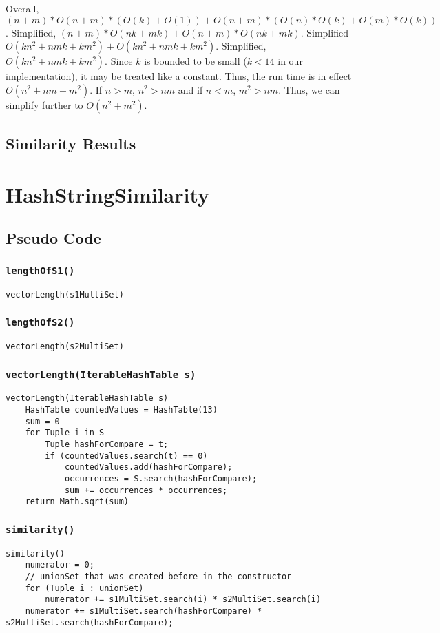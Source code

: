 \documentclass[10pt,letterpaper]{article}
\begin{document}
Overall, $(n+m)*O(n+m)*(O(k)+O(1))+O(n+m)*(O(n)*O(k)+O(m)*O(k))$. Simplified,
$(n+m)*O(nk+mk)+O(n+m)*O(nk+mk)$. Simplified $O(kn^2+nmk+km^2)+O(kn^2+nmk+km^2)$.
Simplified, $O(kn^2+nmk+km^2)$. Since $k$ is bounded to be small ($k<14$ in
our implementation), it may be treated like a constant. Thus, the run time is
in effect $O(n^2+nm+m^2)$. If $n>m$, $n^2>nm$ and if $n<m$, $m^2>nm$. Thus, we
can simplify further to $O(n^2+m^2)$.
\subsection{Similarity Results}
\section{HashStringSimilarity}
\subsection{Pseudo Code}
\subsubsection{\texttt{lengthOfS1()}} 
\begin{verbatim}
vectorLength(s1MultiSet)
\end{verbatim}
\subsubsection{\texttt{lengthOfS2()}}
\begin{verbatim}
vectorLength(s2MultiSet)
\end{verbatim}
\subsubsection{\texttt{vectorLength(IterableHashTable s)}}
\begin{verbatim}
vectorLength(IterableHashTable s)
    HashTable countedValues = HashTable(13)
    sum = 0
    for Tuple i in S
        Tuple hashForCompare = t;
        if (countedValues.search(t) == 0)
            countedValues.add(hashForCompare);
            occurrences = S.search(hashForCompare);
            sum += occurrences * occurrences;
    return Math.sqrt(sum)
\end{verbatim}
\subsubsection{\texttt{similarity()}}
\begin{verbatim}
similarity()
    numerator = 0;
    // unionSet that was created before in the constructor
    for (Tuple i : unionSet)
        numerator += s1MultiSet.search(i) * s2MultiSet.search(i)
    numerator += s1MultiSet.search(hashForCompare) * s2MultiSet.search(hashForCompare);
\end{verbatim}
\end{document}
